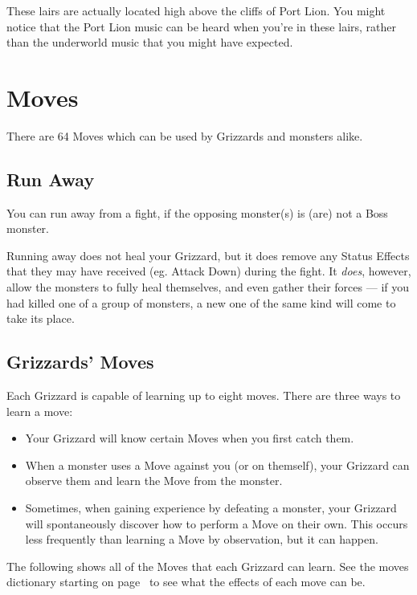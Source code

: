 \documentclass[10pt,twocolumn]{memoir}
\begin{document}
These lairs  are actually located  high above  the cliffs of  Port Lion.
You might notice  that the Port Lion  music can be heard  when you're in
these  lairs,   rather  than  the   underworld  music  that   you  might
have expected.

\chapter{Moves}\label{ch:Moves}

There are  64 Moves which can  be used by Grizzards  and monsters alike.

\section{Run Away}

You can run away  from a fight, if the opposing  monster(s) is (are) not
a Boss monster.

Running away does not heal your  Grizzard, but it does remove any Status
Effects that they may have received  (eg. Attack Down) during the fight.
It \emph{does},  however, allow the  monsters to fully  heal themselves,
and even  gather their forces ---  if you had  killed one of a  group of
monsters, a new one of the same kind will come to take its place.

\section{Grizzards' Moves}\label{sec:GrizzardMoves}

Each Grizzard is capable of learning  up to eight moves. There are three
ways to learn a move:

\begin{itemize}
\item Your Grizzard will know certain Moves when you first catch them.
\item When  a monster  uses a  Move against you  (or on  themself), your
  Grizzard can observe them and learn the Move from the monster.
\item Sometimes,  when gaining experience  by defeating a  monster, your
  Grizzard  will  spontaneously  discover  how  to  perform  a  Move  on
  their  own.  This occurs  less  frequently  than  learning a  Move  by
  observation, but it can happen.
\end{itemize}

The following shows all of the Moves that each Grizzard can learn.
See the  moves dictionary  starting on  page~\pageref{sec:MovesTable} to
see what the effects of each move can be.
\end{document}
